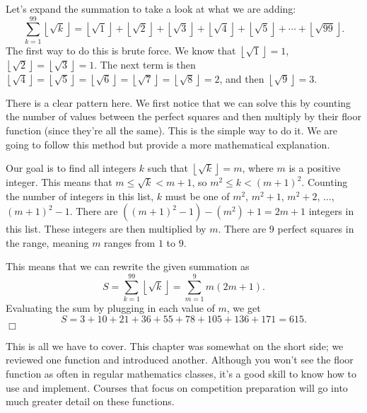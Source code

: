 \documentclass[../book.tex]{subfiles}
\begin{document}
\begin{solution}
Let's expand the summation to take a look at what we are adding: $$\sum_{k=1}^{99}{\left\lfloor{\sqrt{k}}\right\rfloor}=\left\lfloor{\sqrt{1}}\right\rfloor+\left\lfloor{\sqrt{2}}\right\rfloor+\left\lfloor{\sqrt{3}}\right\rfloor+\left\lfloor{\sqrt{4}}\right\rfloor+\left\lfloor{\sqrt{5}}\right\rfloor+\cdots+\left\lfloor{\sqrt{99}}\right\rfloor.$$
The first way to do this is brute force.  We know that $\left\lfloor{\sqrt{1}}\right\rfloor=1$, $\left\lfloor{\sqrt{2}}\right\rfloor=\left\lfloor{\sqrt{3}}\right\rfloor=1$.  The next term is then $\left\lfloor{\sqrt{4}}\right\rfloor=\left\lfloor{\sqrt{5}}\right\rfloor=\left\lfloor{\sqrt{6}}\right\rfloor=\left\lfloor{\sqrt{7}}\right\rfloor=\left\lfloor{\sqrt{8}}\right\rfloor=2$, and then $\left\lfloor{\sqrt{9}}\right\rfloor=3$.

There is a clear pattern here.  We first notice that we can solve this by counting the number of values between the perfect squares and then multiply by their floor function (since they're all the same).  This is the simple way to do it.  We are going to follow this method but provide a more mathematical explanation.

Our goal is to find all integers $k$ such that $\left\lfloor{\sqrt{k}}\right\rfloor=m$, where $m$ is a positive integer.  This means that $m\leq \sqrt{k}<m+1$, so $m^2\leq k<(m+1)^2$.  Counting the number of integers in this list, $k$ must be one of $m^2$, $m^2+1$, $m^2+2$, $\ldots$, $(m+1)^2-1$.  There are $((m+1)^2-1)-(m^2)+1=2m+1$ integers in this list.  These integers are then multiplied by $m$.  There are $9$ perfect squares in the range, meaning $m$ ranges from $1$ to $9$.

This means that we can rewrite the given summation as $$S=\sum_{k=1}^{99}{\left\lfloor{\sqrt{k}}\right\rfloor}=\sum_{m=1}^{9}{m(2m+1)}.$$  Evaluating the sum by plugging in each value of $m$, we get $$S=3+10+21+36+55+78+105+136+171=615.$$ $\Box$
\end{solution}
This is all we have to cover.  This chapter was somewhat on the short side; we reviewed one function and introduced another.  Although you won't see the floor function as often in regular mathematics classes, it's a good skill to know how to use and implement.  Courses that focus on competition preparation will go into much greater detail on these functions.
\end{document}
